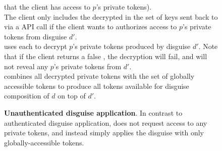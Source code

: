 \begin{figure*}[h]
{    that the client has access to $p$'s private tokens).  \\
    The client only includes the decrypted  in the set of keys sent back to \sys via a
     API call if the client wants to authorizes access to $p$'s private tokens
    from disguise $d'$. \\
    \sys uses each  to decrypt $p$'s private tokens produced by disguise $d'$. Note that
    if the client returns a false , the decryption will fail, and \sys will not reveal any
    $p$'s private tokens from $d'$.\\
    \sys combines all decrypted private tokens with the set of globally accessible tokens to produce
    all tokens available for disguise composition of $d$ on top of $d'$. 
    }
    \label{fig:authdisapp}
\end{figure*}

\begin{figure*}[h]
    \caption{\textbf{Unauthenticated disguise application}. In contrast to authenticated disguise
    application, \sys does not request access to any private tokens, and instead simply applies the disguise  
    with only globally-accessible tokens.}
    \label{fig:unauthdisapp}
\end{figure*}


